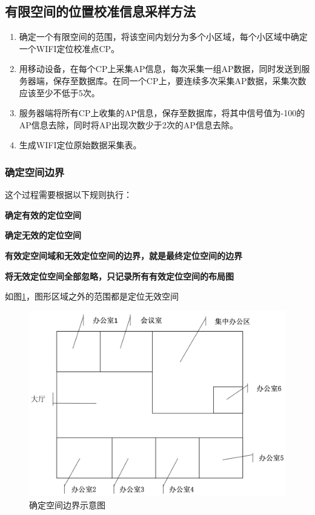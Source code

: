 \documentclass[UTF8, twocolumn ]{ctexart}
\begin{document}
\subsection{有限空间的位置校准信息采样方法}
\begin{enumerate}
\item 确定一个有限空间的范围，将该空间内划分为多个小区域，每个小区域中确定一个WIFI定位校准点CP。
\item 用移动设备，在每个CP上采集AP信息，每次采集一组AP数据，同时发送到服务器端，保存至数据库。在同一个CP上，要连续多次采集AP数据，采集次数应该至少不低于5次。
\item 服务器端将所有CP上收集的AP信息，保存至数据库，将其中信号值为-100的AP信息去除，同时将AP出现次数少于2次的AP信息去除。
\item 生成WIFI定位原始数据采集表。
\end{enumerate}

\subsubsection{确定空间边界}
这个过程需要根据以下规则执行：
\begin{compactitem}
\item\textbf{确定有效的定位空间}
\item\textbf{确定无效的定位空间}
\item\textbf{有效定空间域和无效定位空间的边界，就是最终定位空间的边界}
\item\textbf{将无效定位空间全部忽略，只记录所有有效定位空间的布局图}
\end{compactitem}
\par
如图\ref{fig:2}，图形区域之外的范围都是定位无效空间
\begin{figure}[!ht]\centering
  \includegraphics[keepaspectratio, scale=0.2]{no2.png}
  \caption{确定空间边界示意图\label{fig:2}} 
\end{figure}
\end{document}

